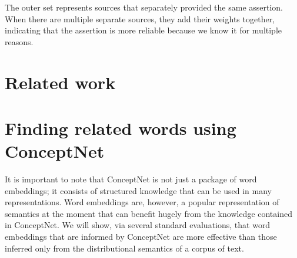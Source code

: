 \documentclass[letterpaper]{article}
\begin{document}
The outer set represents sources that separately provided the same
assertion. When there are multiple separate sources, they add their
weights together, indicating that the assertion is more reliable because
we know it for multiple reasons.





\section{Related work}



\section{Finding related words using ConceptNet}
\label{finding-related-words-using-conceptnet}

It is important to note that ConceptNet is not just a package of word
embeddings; it consists of structured knowledge that can be used in many
representations.  Word embeddings are, however, a popular representation of
semantics at the moment that can benefit hugely from the knowledge contained in
ConceptNet. We will show, via several standard evaluations, that word
embeddings that are informed by ConceptNet are more effective than those
inferred only from the distributional semantics of a corpus of text.
\end{document}
